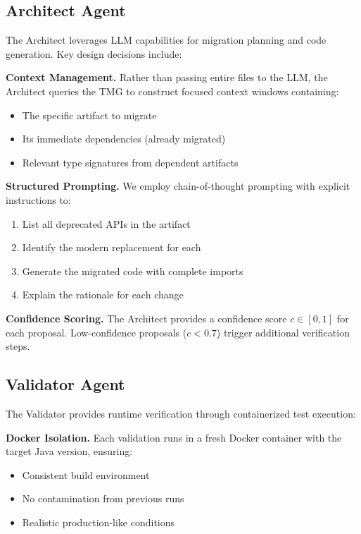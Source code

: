\documentclass[sigconf,review,anonymous]{acmart}
\begin{document}
\subsection{Architect Agent}

The Architect leverages LLM capabilities for migration planning and code generation. Key design decisions include:

\textbf{Context Management.} Rather than passing entire files to the LLM, the Architect queries the TMG to construct focused context windows containing:
\begin{itemize}
    \item The specific artifact to migrate
    \item Its immediate dependencies (already migrated)
    \item Relevant type signatures from dependent artifacts
\end{itemize}

\textbf{Structured Prompting.} We employ chain-of-thought prompting with explicit instructions to:
\begin{enumerate}
    \item List all deprecated APIs in the artifact
    \item Identify the modern replacement for each
    \item Generate the migrated code with complete imports
    \item Explain the rationale for each change
\end{enumerate}

\textbf{Confidence Scoring.} The Architect provides a confidence score $c \in [0, 1]$ for each proposal. Low-confidence proposals ($c < 0.7$) trigger additional verification steps.

\subsection{Validator Agent}

The Validator provides runtime verification through containerized test execution:

\textbf{Docker Isolation.} Each validation runs in a fresh Docker container with the target Java version, ensuring:
\begin{itemize}
    \item Consistent build environment
    \item No contamination from previous runs
    \item Realistic production-like conditions
\end{itemize}
\end{document}
